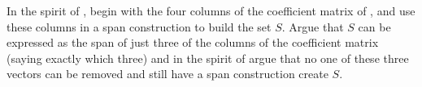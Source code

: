 In the spirit of , begin with the four columns of the coefficient matrix of , and use these columns in a span construction to build the set $S$.  Argue that $S$ can be expressed as the span of just three of the columns of the coefficient matrix (saying exactly which three) and in the spirit of  argue that no one of these three vectors can be removed and still have a span construction create $S$.